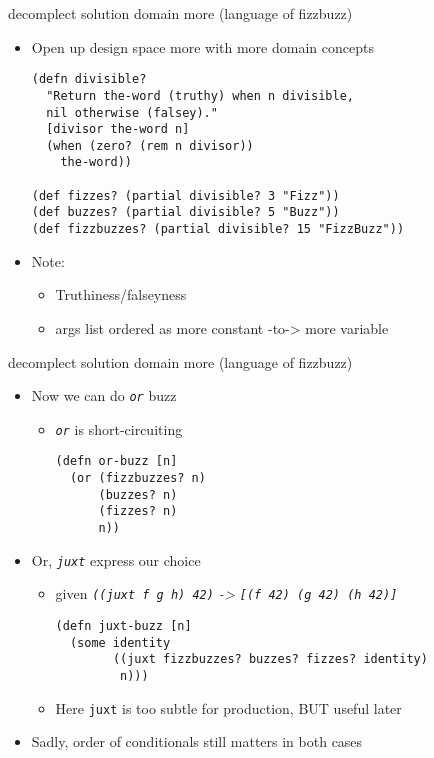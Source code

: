 \documentclass[presentation]{beamer}
\begin{document}
\begin{frame}[label={sec:orga37e5c2},fragile]{decomplect solution domain more (language of fizzbuzz)}
 \begin{itemize}
\item Open up design space more with more domain concepts
\begin{verbatim}
(defn divisible?
  "Return the-word (truthy) when n divisible,
  nil otherwise (falsey)."
  [divisor the-word n]
  (when (zero? (rem n divisor))
    the-word))

(def fizzes? (partial divisible? 3 "Fizz"))
(def buzzes? (partial divisible? 5 "Buzz"))
(def fizzbuzzes? (partial divisible? 15 "FizzBuzz"))
\end{verbatim}
\item Note:
\begin{itemize}
\item Truthiness/falseyness
\item args list ordered as more constant -to-> more variable
\end{itemize}
\end{itemize}
\end{frame}
\begin{frame}[label={sec:orgc8cad74},fragile]{decomplect solution domain more (language of fizzbuzz)}
 \begin{itemize}
\item Now we can do \emph{\texttt{or}} buzz
\begin{itemize}
\item \emph{\texttt{or}} is short-circuiting
\begin{verbatim}
(defn or-buzz [n]
  (or (fizzbuzzes? n)
      (buzzes? n)
      (fizzes? n)
      n))
\end{verbatim}
\end{itemize}
\item Or, \emph{\texttt{juxt}} express our choice
\begin{itemize}
\item given \emph{\texttt{((juxt f g h) 42)} -> \texttt{[(f 42) (g 42) (h 42)]}}
\begin{verbatim}
(defn juxt-buzz [n]
  (some identity
        ((juxt fizzbuzzes? buzzes? fizzes? identity)
         n)))
\end{verbatim}
\item Here \texttt{juxt} is too subtle for production, BUT useful later
\end{itemize}
\item Sadly, order of conditionals still matters in both cases
\end{itemize}
\end{frame}
\end{document}
